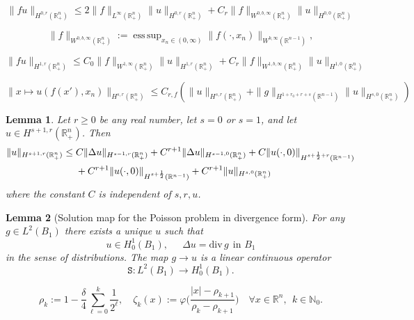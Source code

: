 \documentclass[10pt,a4paper]{amsart}
\newtheorem{lemma}{Lemma}
\newcommand{\N}{{\mathbb N}}
\newcommand{\R}{{\mathbb R}}
\renewcommand{\div}{\mathrm{div}\,}
\DeclareMathOperator*{\esssup}{ess\,sup}
\newcommand{\ph}{\varphi}
\begin{document}
\begin{equation} \label{est.prod.infty.0}
\| fu \|_{H^{0,r}(\R^n_+)} 
\leq 2 \| f \|_{L^\infty(\R^n_+)} \| u \|_{H^{0,r}(\R^n_+)} 
+ C_r \| f \|_{W^{0,b,\infty}(\R^n_+)} \| u \|_{H^{0,0}(\R^n_+)}
\end{equation}

\begin{equation}  \label{def.norm.W.0.b.infty}
\| f \|_{W^{0,b,\infty}(\R^n_+)} := 
\esssup_{x_n \in (0,\infty)} \| f(\cdot, x_n) \|_{W^{b,\infty}(\R^{n-1})}, 
\end{equation}

\begin{equation} \label{est.prod.infty.1}
\| fu \|_{H^{1,r}(\R^n_+)} 
\leq C_0 \| f \|_{W^{1,\infty}(\R^n_+)} \| u \|_{H^{1,r}(\R^n_+)} 
+ C_r \| f \|_{W^{1,b,\infty}(\R^n_+)} \| u \|_{H^{1,0}(\R^n_+)}
\end{equation}

\begin{equation} 
\| x \mapsto u (f(x'),x_n) \|_{H^{s,r}(\R^n_+)} 
\leq C_{r,f} ( \| u \|_{H^{s,r}(\R^n_+)} 
+ \| g \|_{H^{1 + r_0 + r + s}(\R^{n-1})} \| u \|_{H^{s,0}(\R^n_+)} ) 
\label{composition.est.s.r} 
\end{equation}

\begin{lemma} \label{lemma:est.Lap.R.n.+}
Let $r \geq 0$ be any real number, let $s=0$ or $s=1$, 
and let $u \in H^{s+1,r}(\R^n_+)$. Then 
\begin{align} 
\| u \|_{H^{s+1,r}(\R^n_+)} 
& \leq C \| \Delta u \|_{H^{s-1,r}(\R^n_+)} 
+ C^{r+1} \| \Delta u \|_{H^{s-1,0}(\R^n_+)} 
+ C \| u(\cdot, 0) \|_{H^{s + \frac12 + r}(\R^{n-1})}
\notag \\ 
& \quad \ 
+ C^{r+1} \| u(\cdot, 0) \|_{H^{s + \frac12}(\R^{n-1})}
+ C^{r+1} \| u \|_{H^{s,0}(\R^n_+)} 
\label{meran.04}
\end{align}
where the constant $C$ is independent of $s, r, u$. 
\end{lemma}

\begin{lemma}[Solution map for the Poisson problem in divergence form] 
\label{lemma:op.S}
For any $g \in L^2(B_1)$ there exists a unique $u$ such that 
\[
u \in H^1_0(B_1), \quad \ \  
\Delta u = \div g \ \  \text{in } B_1
\]
in the sense of distributions. 
The map $g \to u$ is a linear continuous operator 
\[
\mathtt S : L^2(B_1) \to H^1_0(B_1).
\]
\end{lemma}

\begin{equation}  \label{def.rho.k.zeta.k}
\rho_k := 1 - \frac{\delta}{4} \sum_{\ell=0}^k \frac{1}{2^\ell}, 
\quad 
\zeta_k(x) := \ph \Big( \frac{|x| - \rho_{k+1}}{\rho_k - \rho_{k+1}} \Big)
\quad \forall x \in \R^n, \ \ k \in \N_0.
\end{equation}
\end{document}
